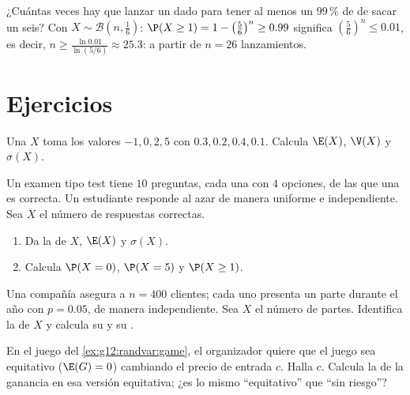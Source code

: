 \begin{example}\label{ex:g12:randvar:atleastone}
¿Cuántas veces hay que lanzar un dado para tener al menos un $99\,\%$ de
 de sacar un seis? Con
$X \sim \mathcal B\left(n, \frac16\right)$:
$\P(X \geq 1) = 1 - \left(\frac56\right)^n \geq 0.99$ significa
$\left(\frac56\right)^n \leq 0.01$, es decir,
$n \geq \frac{\ln 0.01}{\ln(5/6)} \approx 25.3$: a partir de $n = 26$
lanzamientos.
\end{example}

\section{Ejercicios}

\begin{exercise}[$\star$]\label{exo:g12:randvar:1}
Una  $X$ toma los valores $-1, 0, 2, 5$ con
 $0.3, 0.2, 0.4, 0.1$. Calcula $\E(X)$, $\V(X)$ y
$\sigma(X)$.
\end{exercise}

\begin{exercise}[$\star$]\label{exo:g12:randvar:2}
Un examen tipo test tiene $10$ preguntas, cada una con $4$ opciones, de las
que una es correcta. Un estudiante responde al azar de manera uniforme e
independiente. Sea $X$ el número de respuestas correctas.
\begin{enumerate}
  \item Da la  de $X$, $\E(X)$ y $\sigma(X)$.
  \item Calcula $\P(X = 0)$, $\P(X = 5)$ y $\P(X \geq 1)$.
\end{enumerate}
\end{exercise}

\begin{exercise}[$\star$]\label{exo:g12:randvar:3}
Una compañía asegura a $n = 400$ clientes; cada uno presenta un parte
durante el año con  $p = 0.05$, de manera independiente. Sea
$X$ el número de partes. Identifica la  de $X$ y calcula su
 y su .
\end{exercise}

\begin{exercise}[$\star\star$]\label{exo:g12:randvar:4}
En el juego del \cref{ex:g12:randvar:game}, el organizador quiere que el
juego sea equitativo ($\E(G) = 0$) cambiando el precio de entrada $c$.
Halla $c$. Calcula la  de la ganancia en esa versión equitativa;
¿es lo mismo ``equitativo'' que ``sin riesgo''?
\end{exercise}

